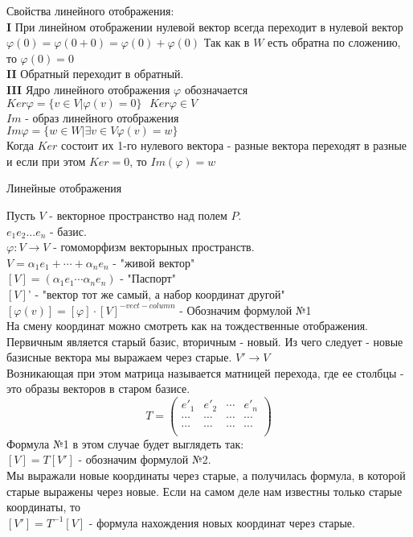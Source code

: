 Свойства линейного отображения:\\
{\bf I} При линейном отображении нулевой вектор всегда переходит в нулевой вектор
$\varphi(0) = \varphi(0+0) = \varphi(0) + \varphi(0)$ Так как в $W$ есть обратна
по сложению, то $\varphi(0) = 0$\\
{\bf II} Обратный переходит в обратный.\\
{\bf III} Ядро линейного отображения $\varphi$ обозначается $Ker \varphi =
\{v \in V | \varphi(v) = 0\} ~~~ Ker \varphi \in V$\\

$Im$ - образ линейного отображения\\
$Im \varphi = \{w \in W | \exists v \in V \varphi(v) = w\}$\\

Когда $Ker$ состоит их 1-го нулевого вектора - разные вектора переходят в разные
 и если при этом $Ker = {0}$, то $Im(\varphi) = w$\\

\begin{title}
  {Линейные отображения}
\end{title}
Пусть $V$ - векторное пространство над полем $P$.\\
$e_1 e_2 ... e_n$ - базис.\\
$\varphi : V \to V$ - гомоморфизм векторыных пространств.\\
$V = \alpha_1 e_1 + \cdots + \alpha_n e_n$ - "живой вектор"\\
$[V] = (\alpha_1 e_1 \cdots \alpha_n e_n)$ - "Паспорт"\\
$[V]$' - "вектор тот же самый, а набор координат другой"\\
$[\varphi(v)] = [\varphi] \cdot [V]^{-vect-column}$ - Обозначим формулой №1\\

На смену координат можно смотреть как на тождественные отображения. Первичным
является старый базис, вторичным - новый. Из чего следует - новые базисные
вектора мы выражаем через старые. $V' \to V$\\
Возникающая при этом матрица называется матницей перехода, где ее столбцы - это
образы векторов в старом базисе.\\
\begin{displaymath}
T = \left(\begin{array}{lccr}
e'_1 & e'_2 & \cdots & e'_n\\
\cdots & \cdots & \cdots & \cdots\\
\cdots & \cdots & \cdots & \cdots\\
\end{array}\right)
\end{displaymath}
Формула №1 в этом случае будет выглядеть так:\\
$[V] = T[V']$ - обозначим формулой №2.\\
Мы выражали новые координаты через старые, а получилась формула, в которой
старые выражены через новые. Если на самом деле нам известны только старые
координаты, то\\
$[V'] = T^{-1}[V]$ - формула нахождения новых координат через старые.\\

